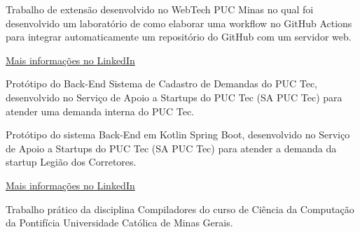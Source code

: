 \documentclass[10pt,a4paper,ragged2e,withhyper]{altacv}
\begin{document}
\begin{paracol}{2}
            Trabalho de extensão desenvolvido no WebTech PUC Minas no qual foi desenvolvido um laboratório de como elaborar uma workflow no GitHub Actions para integrar automaticamente um repositório do GitHub com um servidor web.\\
            \divider

            {\large\color{emphasis}\href{https://www.linkedin.com/in/henriquemcc/details/projects/}{Mais informações no LinkedIn}}
            


            Protótipo do Back-End Sistema de Cadastro de Demandas do PUC Tec, desenvolvido no Serviço de Apoio a Startups do PUC Tec (SA PUC Tec) para atender uma demanda interna do PUC Tec.\\
            \divider

            Protótipo do sistema Back-End em Kotlin Spring Boot, desenvolvido no Serviço de Apoio a Startups do PUC Tec (SA PUC Tec) para atender a demanda da startup Legião dos Corretores.\\
            \divider

        {\large\color{emphasis}\href{https://www.linkedin.com/in/henriquemcc/details/projects/}{Mais informações no LinkedIn}}


            Trabalho prático da disciplina Compiladores do curso de Ciência da Computação da Pontifícia Universidade Católica de Minas Gerais.\\
            \divider


\end{paracol}
\end{document}
